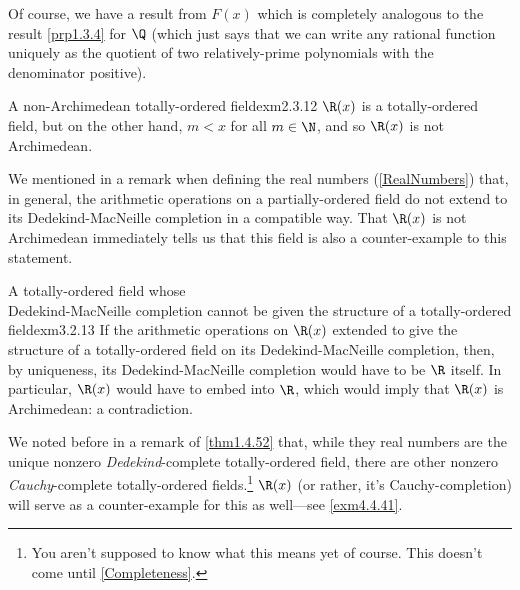 Of course, we have a result from $F(x)$ which is completely analogous to the result \cref{prp1.3.4} for $\Q$ (which just says that we can write any rational function uniquely as the quotient of two relatively-prime polynomials with the denominator positive).
\begin{exm}{A non-Archimedean totally-order\-ed field}{exm2.3.12}
$\R (x)$ is a totally-ordered field, but on the other hand, $m<x$ for all $m\in \N$, and so $\R (x)$ is not Archimedean.
\end{exm}
We mentioned in a remark when defining the real numbers (\cref{RealNumbers}) that, in general, the arithmetic operations on a partially-ordered field do not extend to its Dedekind-MacNeille completion in a compatible way.  That $\R (x)$ is not Archimedean immediately tells us that this field is also a counter-example to this statement.
\begin{exm}{A totally-ordered field whose \\ Dedekind-MacNeille completion cannot be given the structure of a totally-ordered field}{exm3.2.13}
If the arithmetic operations on $\R (x)$ extended to give the structure of a totally-ordered field on its Dedekind-MacNeille completion, then, by uniqueness, its Dedekind-MacNeille completion would have to be $\R$ itself.  In particular, $\R (x)$ would have to embed into $\R$, which would imply that $\R (x)$ is Archimedean:  a contradiction.
\begin{rmk}
We noted before in a remark of \cref{thm1.4.52} that, while they real numbers are the unique nonzero \emph{Dedekind}-complete totally-ordered field, there are other nonzero \emph{Cauchy}-complete totally-ordered fields.\footnote{You aren't supposed to know what this means yet of course.  This doesn't come until \cref{Completeness}.}  $\R (x)$ (or rather, it's Cauchy-completion) will serve as a counter-example for this as well---see \cref{exm4.4.41}.
\end{rmk}
\end{exm}

\horizontalrule

